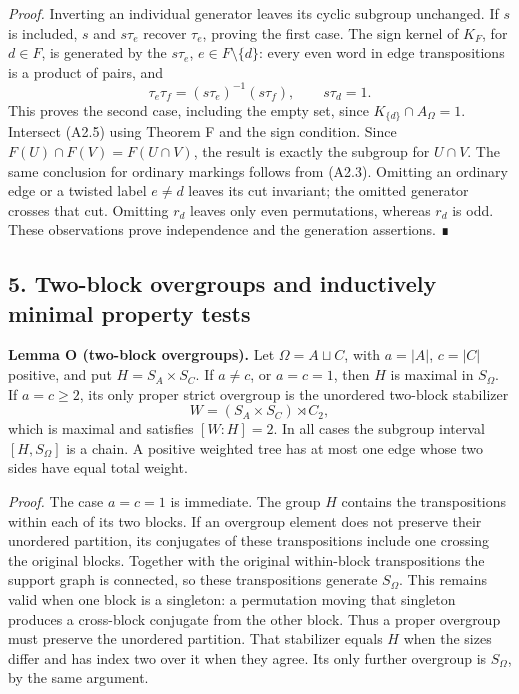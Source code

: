 \documentclass[
  10pt,
  letterpaper,
]{article}
\begin{document}
\emph{Proof.} Inverting an individual generator leaves its cyclic
subgroup unchanged. If \(s\) is included, \(s\) and \(s\tau_e\) recover
\(\tau_e\), proving the first case. The sign kernel of \(K_F\), for
\(d\in F\), is generated by the \(s\tau_e\), \(e\in F\setminus\{d\}\):
every even word in edge transpositions is a product of pairs, and \[
\tau_e\tau_f=(s\tau_e)^{-1}(s\tau_f),\qquad s\tau_d=1.
\] This proves the second case, including the empty set, since
\(K_{\{d\}}\cap A_\Omega=1\). Intersect (A2.5) using Theorem F and the
sign condition. Since \(F(U)\cap F(V)=F(U\cap V)\), the result is
exactly the subgroup for \(U\cap V\). The same conclusion for ordinary
markings follows from (A2.3). Omitting an ordinary edge or a twisted
label \(e\ne d\) leaves its cut invariant; the omitted generator crosses
that cut. Omitting \(r_d\) leaves only even permutations, whereas
\(r_d\) is odd. These observations prove independence and the generation
assertions. ∎

\subsection{5. Two-block overgroups and inductively minimal property
tests}\label{two-block-overgroups-and-inductively-minimal-property-tests}

\textbf{Lemma O (two-block overgroups).} Let \(\Omega=A\sqcup C\), with
\(a=|A|\), \(c=|C|\) positive, and put \(H=S_A\times S_C\). If
\(a\ne c\), or \(a=c=1\), then \(H\) is maximal in \(S_\Omega\). If
\(a=c\geq2\), its only proper strict overgroup is the unordered
two-block stabilizer \[
W=(S_A\times S_C)\rtimes C_2,
\] which is maximal and satisfies \([W:H]=2\). In all cases the subgroup
interval \([H,S_\Omega]\) is a chain. A positive weighted tree has at
most one edge whose two sides have equal total weight.

\emph{Proof.} The case \(a=c=1\) is immediate. The group \(H\) contains
the transpositions within each of its two blocks. If an overgroup
element does not preserve their unordered partition, its conjugates of
these transpositions include one crossing the original blocks. Together
with the original within-block transpositions the support graph is
connected, so these transpositions generate \(S_\Omega\). This remains
valid when one block is a singleton: a permutation moving that singleton
produces a cross-block conjugate from the other block. Thus a proper
overgroup must preserve the unordered partition. That stabilizer equals
\(H\) when the sizes differ and has index two over it when they agree.
Its only further overgroup is \(S_\Omega\), by the same argument.
\end{document}
